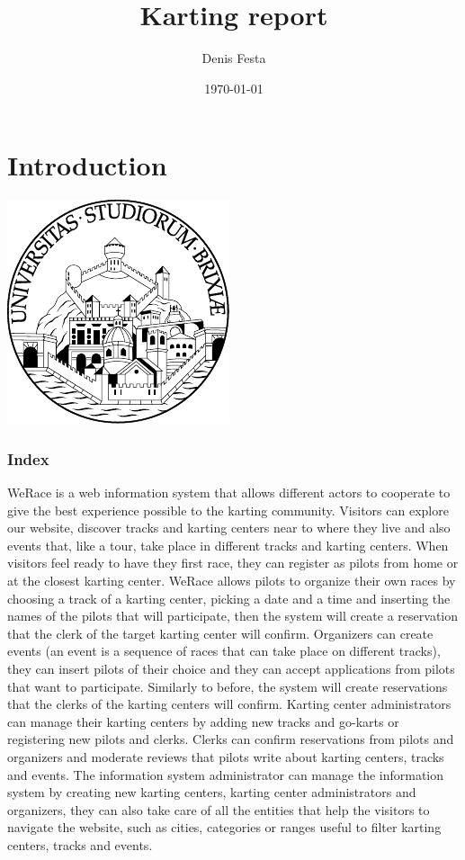\documentclass{beamer}
\title{Karting report}
\author{Denis Festa}
\date{\today}
\newcommand{\kc}{WeRace}
\begin{document}
\section*{Introduction}

\begin{frame}
    \titlepage
    \centering
    \includegraphics[width=0.2\linewidth]{unibs-circ-logo.pdf}
\end{frame}


\begin{frame}
    \frametitle{Index}
    \tableofcontents
\end{frame}


\begin{frame}
\footnotesize
\kc{} is a web information system that allows different actors to cooperate
to give the best experience possible to the karting community.
Visitors can explore our website, discover tracks and karting centers 
near to where they live and also events that, like a tour, take place 
in different tracks and karting centers. When visitors feel ready
to have they first race, they can register as pilots from home or 
at the closest karting center. \kc{} allows pilots to organize
their own races by choosing a track of a karting center, picking a date 
and a time and inserting the names of the pilots that will participate,
then the system will create a reservation that the clerk of the target karting center
will confirm. Organizers can create events (an event is a sequence of races that can take
place on different tracks), they can insert pilots of their choice and they can accept
applications from pilots that want to participate. Similarly to before, the system 
will create reservations that the clerks of the karting centers will confirm.
Karting center administrators can manage their karting centers by adding new
tracks and go-karts or registering new pilots and clerks.
Clerks can confirm reservations from pilots and organizers and moderate reviews
that pilots write about karting centers, tracks and events.
The information system administrator can manage the information system by creating new karting centers,
karting center administrators and organizers, they can also take care of all the
entities that help the visitors to navigate the website, such as cities, categories or ranges 
useful to filter karting centers, tracks and events.
\end{frame}
\end{document}
